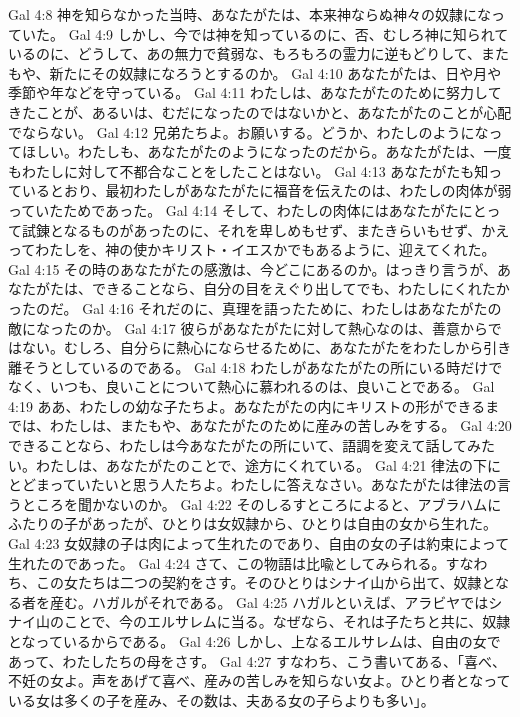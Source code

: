 Gal 4:8  神を知らなかった当時、あなたがたは、本来神ならぬ神々の奴隷になっていた。
Gal 4:9  しかし、今では神を知っているのに、否、むしろ神に知られているのに、どうして、あの無力で貧弱な、もろもろの霊力に逆もどりして、またもや、新たにその奴隷になろうとするのか。
Gal 4:10  あなたがたは、日や月や季節や年などを守っている。
Gal 4:11  わたしは、あなたがたのために努力してきたことが、あるいは、むだになったのではないかと、あなたがたのことが心配でならない。
Gal 4:12  兄弟たちよ。お願いする。どうか、わたしのようになってほしい。わたしも、あなたがたのようになったのだから。あなたがたは、一度もわたしに対して不都合なことをしたことはない。
Gal 4:13  あなたがたも知っているとおり、最初わたしがあなたがたに福音を伝えたのは、わたしの肉体が弱っていたためであった。
Gal 4:14  そして、わたしの肉体にはあなたがたにとって試錬となるものがあったのに、それを卑しめもせず、またきらいもせず、かえってわたしを、神の使かキリスト・イエスかでもあるように、迎えてくれた。
Gal 4:15  その時のあなたがたの感激は、今どこにあるのか。はっきり言うが、あなたがたは、できることなら、自分の目をえぐり出してでも、わたしにくれたかったのだ。
Gal 4:16  それだのに、真理を語ったために、わたしはあなたがたの敵になったのか。
Gal 4:17  彼らがあなたがたに対して熱心なのは、善意からではない。むしろ、自分らに熱心にならせるために、あなたがたをわたしから引き離そうとしているのである。
Gal 4:18  わたしがあなたがたの所にいる時だけでなく、いつも、良いことについて熱心に慕われるのは、良いことである。
Gal 4:19  ああ、わたしの幼な子たちよ。あなたがたの内にキリストの形ができるまでは、わたしは、またもや、あなたがたのために産みの苦しみをする。
Gal 4:20  できることなら、わたしは今あなたがたの所にいて、語調を変えて話してみたい。わたしは、あなたがたのことで、途方にくれている。
Gal 4:21  律法の下にとどまっていたいと思う人たちよ。わたしに答えなさい。あなたがたは律法の言うところを聞かないのか。
Gal 4:22  そのしるすところによると、アブラハムにふたりの子があったが、ひとりは女奴隷から、ひとりは自由の女から生れた。
Gal 4:23  女奴隷の子は肉によって生れたのであり、自由の女の子は約束によって生れたのであった。
Gal 4:24  さて、この物語は比喩としてみられる。すなわち、この女たちは二つの契約をさす。そのひとりはシナイ山から出て、奴隷となる者を産む。ハガルがそれである。
Gal 4:25  ハガルといえば、アラビヤではシナイ山のことで、今のエルサレムに当る。なぜなら、それは子たちと共に、奴隷となっているからである。
Gal 4:26  しかし、上なるエルサレムは、自由の女であって、わたしたちの母をさす。
Gal 4:27  すなわち、こう書いてある、「喜べ、不妊の女よ。声をあげて喜べ、産みの苦しみを知らない女よ。ひとり者となっている女は多くの子を産み、その数は、夫ある女の子らよりも多い」。
